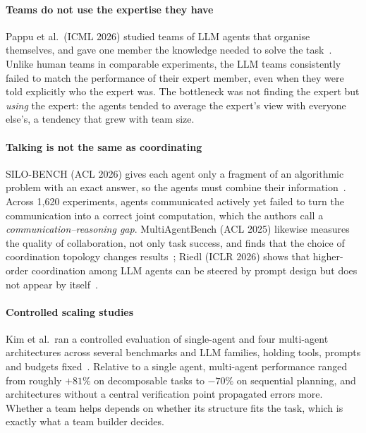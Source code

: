 \documentclass[10pt,a4paper]{article}
\begin{document}
\paragraph{Teams do not use the expertise they have} Pappu et al.\
(ICML 2026) studied teams of LLM agents that organise themselves, and gave
one member the knowledge needed to solve the task~\cite{pappu2026experts}.
Unlike human teams in comparable experiments, the LLM teams consistently
failed to match the performance of their expert member, even when they
were told explicitly who the expert was. The bottleneck was not finding
the expert but \emph{using} the expert: the agents tended to average the
expert's view with everyone else's, a tendency that grew with team size.

\paragraph{Talking is not the same as coordinating} SILO-BENCH (ACL 2026)
gives each agent only a fragment of an algorithmic problem with an exact
answer, so the agents must combine their information~\cite{zhang2026silobench}.
Across 1{,}620 experiments, agents communicated actively yet failed to turn
the communication into a correct joint computation, which the authors call
a \emph{communication--reasoning gap}. MultiAgentBench (ACL 2025) likewise
measures the quality of collaboration, not only task success, and finds that
the choice of coordination topology changes results~\cite{zhu2025multiagentbench};
Riedl (ICLR 2026) shows that higher-order coordination among LLM agents can
be steered by prompt design but does not appear by
itself~\cite{riedl2026emergent}.

\paragraph{Controlled scaling studies} Kim et al.\ ran a controlled
evaluation of single-agent and four multi-agent architectures across
several benchmarks and LLM families, holding tools, prompts and budgets
fixed~\cite{kim2025scaling}. Relative to a single agent, multi-agent
performance ranged from roughly $+81\%$ on decomposable tasks to $-70\%$ on
sequential planning, and architectures without a central verification
point propagated errors more. Whether a team helps depends on whether its
structure fits the task, which is exactly what a team builder decides.
\end{document}
